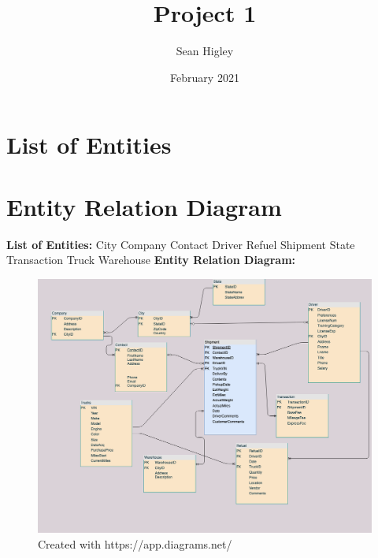 \documentclass{article}
\title{Project 1}
\author{Sean Higley}
\date{February 2021}
\begin{document}
\maketitle

\section{List of Entities}
\section{Entity Relation Diagram}
\pagebreak
\newpage 
\begin{flushleft}
\textbf{List of Entities:} \newline \newline
City \newline
Company \newline
Contact \newline
Driver \newline
Refuel \newline
Shipment \newline
State \newline
Transaction \newline
Truck \newline
Warehouse \newline \newline \newline
\textbf{Entity Relation Diagram:} \newline
\end{flushleft}

\begin{figure}[h]
    \centering
    \includegraphics[width=\textwidth]{images/erDiagram.png}
    \caption{Created with https://app.diagrams.net/}
    \label{fig:my_label}
\end{figure}
\end{document}

